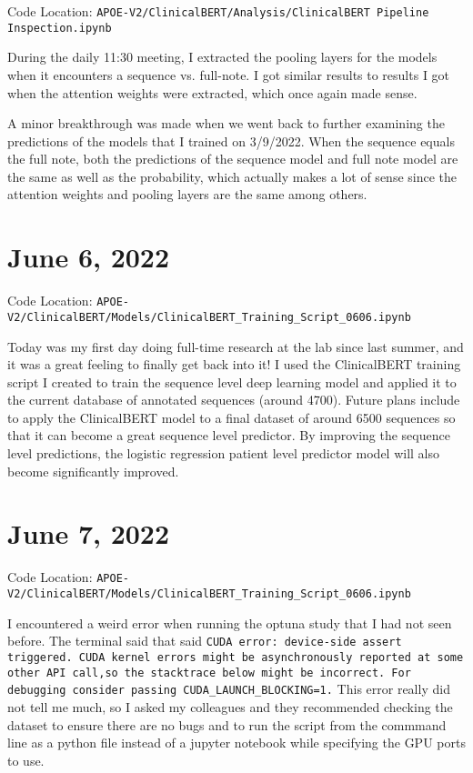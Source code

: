 \documentclass[11pt,letterpaper]{article}
\begin{document}
Code Location: \texttt{APOE-V2/ClinicalBERT/Analysis/ClinicalBERT Pipeline Inspection.ipynb}

During the daily 11:30 meeting, I extracted the pooling layers for the models when it encounters a sequence vs. full-note. I got similar results to results I got when the attention weights were extracted, which once again made sense.

A minor breakthrough was made when we went back to further examining the predictions of the models that I trained on 3/9/2022. When the sequence equals the full note, both the predictions of the sequence model and full note model are the same as well as the probability, which actually makes a lot of sense since the attention weights and pooling layers are the same among others. 

\section{June 6, 2022}

Code Location: \texttt{APOE-V2/ClinicalBERT/Models/ClinicalBERT\_Training\_Script\_0606.ipynb}

Today was my first day doing full-time research at the lab since last summer, and it was a great feeling to finally get back into it! I used the ClinicalBERT training script I created to train the sequence level deep learning model and applied it to the current database of annotated sequences (around 4700). Future plans include to apply the ClinicalBERT model to a final dataset of around 6500 sequences so that it can become a great sequence level predictor. By improving the sequence level predictions, the logistic regression patient level predictor model will also become significantly improved. 

\section{June 7, 2022}

Code Location: \texttt{APOE-V2/ClinicalBERT/Models/ClinicalBERT\_Training\_Script\_0606.ipynb}

I encountered a weird error when running the optuna study that I had not seen before. The terminal said that said \texttt{CUDA error: device-side assert triggered. CUDA kernel errors might be asynchronously reported at some other API call,so the stacktrace below might be incorrect. For debugging consider passing CUDA\_LAUNCH\_BLOCKING=1.} This error really did not tell me much, so I asked my colleagues and they recommended checking the dataset to ensure there are no bugs and to run the script from the commmand line as a python file instead of a jupyter notebook while specifying the GPU ports to use.
\end{document}
